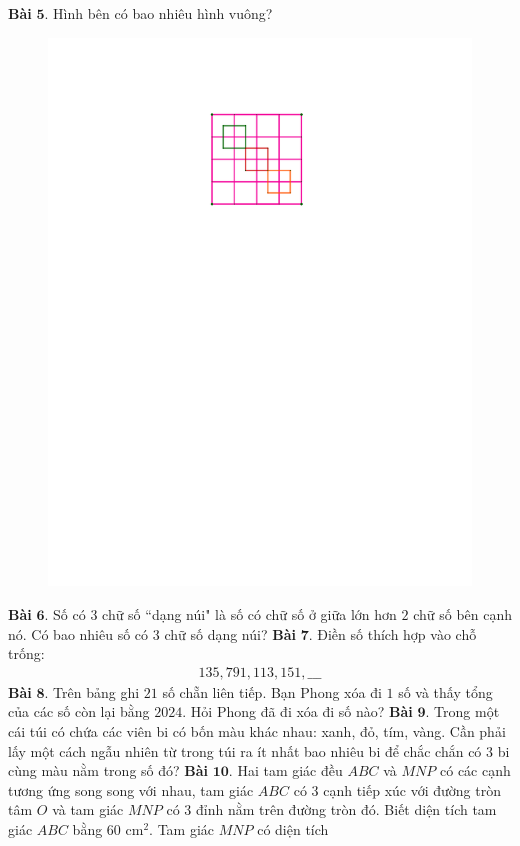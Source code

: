 \begin{multicols}{2}
\begin{table}[H]
	\end{table}
	\textbf{\color{toancuabi}Bài} $\pmb{5.}$ Hình bên có bao nhiêu hình vuông?
	\begin{figure}[H]
		\vspace*{-5pt}
		\centering
		\captionsetup{labelformat= empty, justification=centering}
		\includegraphics[width= 0.7\linewidth]{bai5k3}
		\vspace*{-10pt}
	\end{figure}
	\textbf{\color{toancuabi}Bài} $\pmb{6.}$ Số có $3$ chữ số ``dạng núi" là số có chữ số ở giữa lớn hơn $2$ chữ số bên cạnh nó. Có bao nhiêu số có $3$ chữ số dạng núi?
	\vskip 0.1cm
	\textbf{\color{toancuabi}Bài} $\pmb{7.}$ Điền số thích hợp vào chỗ trống:
	\begin{align*}
		135, 791, 113, 151, \_\_\_
	\end{align*}
	\textbf{\color{toancuabi}Bài} $\pmb{8.}$ Trên bảng ghi $21$ số chẵn liên tiếp. Bạn Phong xóa đi $1$ số và thấy tổng của các số còn lại bằng $2024$. Hỏi Phong đã đi xóa đi số nào?
	\vskip 0.1cm
	\textbf{\color{toancuabi}Bài} $\pmb{9.}$ Trong một cái túi có chứa các viên bi có bốn màu khác nhau: xanh, đỏ, tím, vàng. Cần phải lấy một cách ngẫu nhiên từ trong túi ra ít nhất bao nhiêu bi để chắc chắn có $3$ bi cùng màu nằm trong số
	đó?
	\vskip 0.1cm
	\textbf{\color{toancuabi}Bài} $\pmb{10.}$ Hai tam giác đều $ABC$ và $MNP$ có
	các cạnh tương ứng song song với nhau, tam giác $ABC$ có $3$ cạnh tiếp xúc với đường tròn tâm $O$ và tam giác $MNP$ có $3$ đỉnh nằm trên đường tròn đó. Biết diện tích tam giác $ABC$ bằng $60$ cm$^2$. Tam giác $MNP$ có diện tích

\end{multicols}
